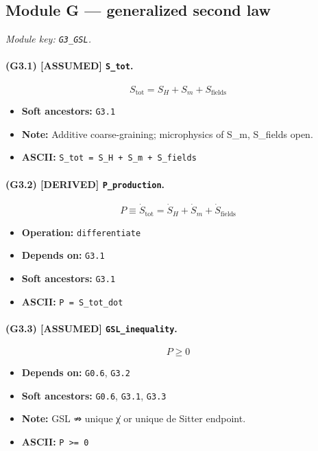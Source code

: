 \documentclass[11pt,a4paper]{article}
\theoremstyle{remark}\newtheorem*{caution}{Caution}
\newcommand{\tagbox}[1]{\textsc{[#1]}}
\begin{document}
\subsection{Module G --- generalized second law}
\textit{Module key: \texttt{G3\_GSL}.}
\paragraph{(G3.1) \tagbox{ASSUMED} \texttt{S\_tot}.}
\begin{equation}
S_{\mathrm{tot}}=S_H+S_m+S_{\mathrm{fields}}
\tag{G3.1}
\end{equation}
\begin{itemize}\setlength{\itemsep}{0.12em}
\item \textbf{Soft ancestors:} \texttt{G3.1}
\item \textbf{Note:} Additive coarse-graining; microphysics of S\_m, S\_fields open.
\item \textbf{ASCII:} \texttt{S\_tot = S\_H + S\_m + S\_fields}
\end{itemize}
\paragraph{(G3.2) \tagbox{DERIVED} \texttt{P\_production}.}
\begin{equation}
P\equiv\dot S_{\mathrm{tot}}=\dot S_H+\dot S_m+\dot S_{\mathrm{fields}}
\tag{G3.2}
\end{equation}
\begin{itemize}\setlength{\itemsep}{0.12em}
\item \textbf{Operation:} \texttt{differentiate}
\item \textbf{Depends on:} \texttt{G3.1}
\item \textbf{Soft ancestors:} \texttt{G3.1}
\item \textbf{ASCII:} \texttt{P = S\_tot\_dot}
\end{itemize}
\paragraph{(G3.3) \tagbox{ASSUMED} \texttt{GSL\_inequality}.}
\begin{equation}
P\ge 0
\tag{G3.3}
\end{equation}
\begin{itemize}\setlength{\itemsep}{0.12em}
\item \textbf{Depends on:} \texttt{G0.6}, \texttt{G3.2}
\item \textbf{Soft ancestors:} \texttt{G0.6}, \texttt{G3.1}, \texttt{G3.3}
\item \textbf{Note:} GSL ⇏ unique χ̇ or unique de Sitter endpoint.
\item \textbf{ASCII:} \texttt{P >= 0}
\end{itemize}
\end{document}
